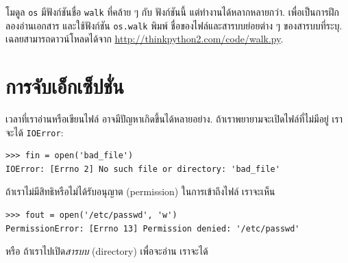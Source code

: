 
โมดูล \texttt{os} มีฟังก์ชันชื่อ \texttt{walk} ที่คล้าย ๆ กับ ฟังก์ชันนี้ แต่ทำงานได้หลากหลายกว่า.
เพื่อเป็นการฝึก
ลองอ่านเอกสาร และใช้ฟังก์ชัน \texttt{os.walk} พิมพ์ ชื่อของไฟล์และสารบบย่อยต่าง ๆ ของสารบบที่ระบุ.
เฉลยสามารถดาวน์โหลดได้จาก
\url{http://thinkpython2.com/code/walk.py}.

\section{การจับเอ็กเซ็ปชั่น}
\label{catch}


เวลาที่เราอ่านหรือเขียนไฟล์ อาจมีปัญหาเกิดขึ้นได้หลายอย่าง.
ถ้าเราพยายามจะเปิดไฟล์ที่ไม่มีอยู่ เราจะได้ \texttt{IOError}:

\begin{verbatim}
>>> fin = open('bad_file')
IOError: [Errno 2] No such file or directory: 'bad_file'
\end{verbatim}
%
%
ถ้าเราไม่มีสิทธิหรือไม่ได้รับอนุญาต (permission) ในการเข้าถึงไฟล์
เราจะเห็น

\begin{verbatim}
>>> fout = open('/etc/passwd', 'w')
PermissionError: [Errno 13] Permission denied: '/etc/passwd'
\end{verbatim}
%
%
หรือ ถ้าเราไปเปิด\textit{สารบบ} (directory) เพื่อจะอ่าน
เราจะได้

